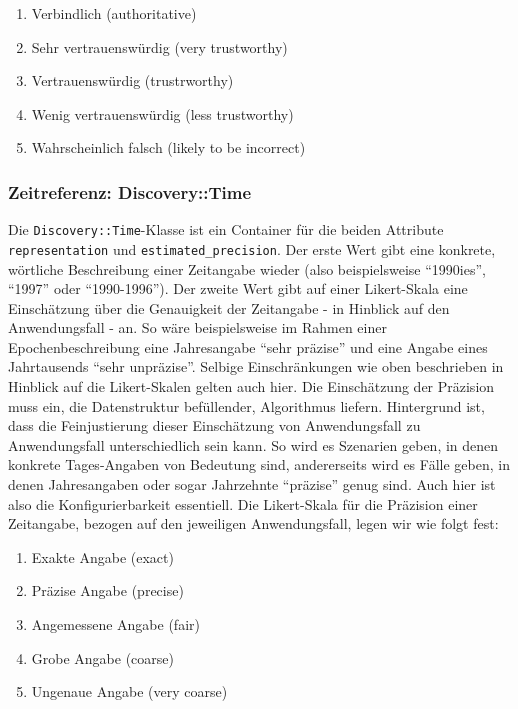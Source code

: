\begin{enumerate}
  \item Verbindlich (authoritative)
  \item Sehr vertrauenswürdig (very trustworthy)
  \item Vertrauenswürdig (trustrworthy)
  \item Wenig vertrauenswürdig (less trustworthy)
  \item Wahrscheinlich falsch (likely to be incorrect)
\end{enumerate}

\subsubsection{Zeitreferenz: Discovery::Time}
Die \texttt{Discovery::Time}-Klasse ist ein Container für die beiden Attribute \texttt{representation} und \texttt{estimated\_precision}. Der erste Wert gibt eine konkrete, wörtliche Beschreibung einer Zeitangabe wieder (also beispielsweise ``1990ies'', ``1997'' oder ``1990-1996''). Der zweite Wert gibt auf einer Likert-Skala eine Einschätzung über die Genauigkeit der Zeitangabe - in Hinblick auf den Anwendungsfall - an. So wäre beispielsweise im Rahmen einer Epochenbeschreibung eine Jahresangabe ``sehr präzise'' und eine Angabe eines Jahrtausends ``sehr unpräzise''. Selbige Einschränkungen wie oben beschrieben in Hinblick auf die Likert-Skalen gelten auch hier. Die Einschätzung der Präzision muss ein, die Datenstruktur befüllender, Algorithmus liefern. Hintergrund ist, dass die Feinjustierung dieser Einschätzung von Anwendungsfall zu Anwendungsfall unterschiedlich sein kann. So wird es Szenarien geben, in denen konkrete Tages-Angaben von Bedeutung sind, andererseits wird es Fälle geben, in denen Jahresangaben oder sogar Jahrzehnte ``präzise'' genug sind. Auch hier ist also die Konfigurierbarkeit essentiell. Die Likert-Skala für die Präzision einer Zeitangabe, bezogen auf den jeweiligen Anwendungsfall, legen wir wie folgt fest:

\begin{enumerate}
  \item Exakte Angabe (exact)
  \item Präzise Angabe (precise)
  \item Angemessene Angabe (fair)
  \item Grobe Angabe (coarse)
  \item Ungenaue Angabe (very coarse)
\end{enumerate}

